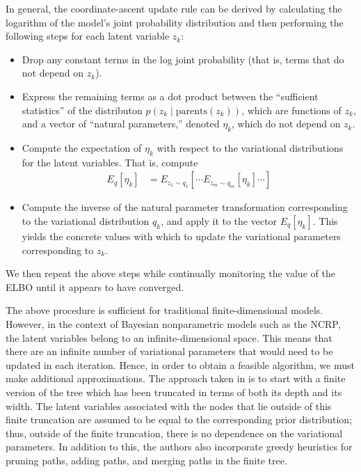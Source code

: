 \documentclass{article}
\begin{document}
In general, the coordinate-ascent update rule can be derived by calculating the logarithm of the model's joint probability distribution and then performing the following steps for each latent variable $z_k$:
\begin{itemize}
\item Drop any constant terms in the log joint probability (that is, terms that do not depend on $z_k$).
\item Express the remaining terms as a dot product between the ``sufficient statistics'' of the distributon $p(z_k \mid \text{parents}(z_k))$, which are functions of $z_k$, and a vector of ``natural parameters,'' denoted $\eta_k$, which do not depend on $z_k$.
\item Compute the expectation of $\eta_k$ with respect to the variational distributions for the latent variables.
That is, compute
\begin{align*}
E_q[\eta_k] &= E_{z_1 \sim q_1} \left[ \cdots E_{z_m \sim q_m} \left[ \eta_k \right] \cdots \right]
\end{align*}
\item Compute the inverse of the natural parameter transformation corresponding to the variational distribution $q_k$, and apply it to the vector $E_q[\eta_k]$.
This yields the concrete values with which to update the variational parameters corresponding to $z_k$.
\end{itemize}
We then repeat the above steps while continually monitoring the value of the ELBO until it appears to have converged.

The above procedure is sufficient for traditional finite-dimensional models.
However, in the context of Bayesian nonparametric models such as the NCRP, the latent variables belong to an infinite-dimensional space.
This means that there are an infinite number of variational parameters that would need to be updated in each iteration.
Hence, in order to obtain a feasible algorithm, we must make additional approximations.
The approach taken in \cite{wang2009vi_ncrp} is to start with a finite version of the tree which has been truncated in terms of both its depth and its width.
The latent variables associated with the nodes that lie outside of this finite truncation are assumed to be equal to the corresponding prior distribution; thus, outside of the finite truncation, there is no dependence on the variational parameters.
In addition to this, the authors also incorporate greedy heuristics for pruning paths, adding paths, and merging paths in the finite tree.
\end{document}
